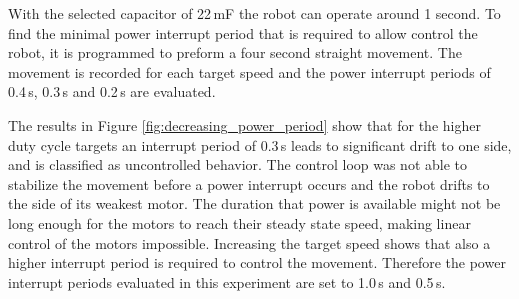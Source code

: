 With the selected capacitor of 22\,mF the robot can operate around 1 second. 
To find the minimal power interrupt period that is required to allow control the robot, it is programmed to preform a four second straight movement.
The movement is recorded for each target speed and the power interrupt periods of 0.4\,s, 0.3\,s and 0.2\,s are evaluated.

The results in Figure \ref{fig:decreasing_power_period} show that for the higher duty cycle targets an interrupt period of 0.3\,s leads to significant drift to one side, and is classified as uncontrolled behavior.
The control loop was not able to stabilize the movement before a power interrupt occurs and the robot drifts to the side of its weakest motor.
The duration that power is available might not be long enough for the motors to reach their steady state speed, making linear control of the motors impossible.
Increasing the target speed shows that also a higher interrupt period is required to control the movement. 
Therefore the power interrupt periods evaluated in this experiment are set to 1.0\,s and 0.5\,s.


